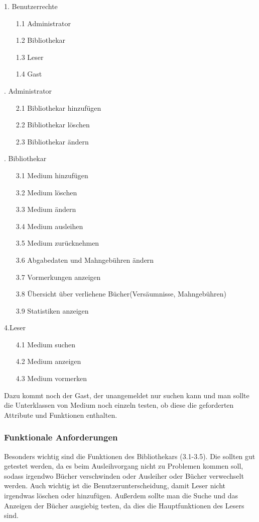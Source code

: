 \documentclass[fontsize=12pt,paper=a4,twoside]{scrartcl}
\begin{document}
1. Benutzerrechte\\
\begin{itemize}
\item[1.1]Administrator 
\item[1.2]Bibliothekar 
\item[1.3]Leser 
\item[1.4]Gast
\end{itemize}
. Administrator\\
\begin{itemize}
\item[2.1]Bibliothekar hinzufügen
\item[2.2]Bibliothekar löschen
\item[2.3]Bibliothekar ändern
\end{itemize}
. Bibliothekar\\
\begin{itemize}
\item[3.1]Medium hinzufügen
\item[3.2]Medium löschen
\item[3.3]Medium ändern
\item[3.4]Medium ausleihen
\item[3.5]Medium zurücknehmen
\item[3.6]Abgabedaten und Mahngebühren ändern
\item[3.7]Vormerkungen anzeigen
\item[3.8]Übersicht über verliehene Bücher(Versäumnisse, Mahngebühren)
\item[3.9]Statistiken anzeigen
\end{itemize}
\bigskip
4.Leser\\
\begin{itemize}
\item[4.1]Medium suchen
\item[4.2]Medium anzeigen
\item[4.3]Medium vormerken
\end{itemize}
\bigskip
Dazu kommt noch der Gast, der unangemeldet nur suchen kann und man sollte die Unterklassen von Medium noch einzeln testen, ob diese die geforderten Attribute und Funktionen enthalten.

\subsubsection{Funktionale Anforderungen} 

Besonders wichtig sind die Funktionen des Bibliothekars (3.1-3.5). Die sollten gut getestet werden, da es beim Ausleihvorgang nicht zu Problemen kommen soll, sodass irgendwo Bücher verschwinden oder Ausleiher oder Bücher verwechselt werden. Auch wichtig ist die Benutzerunterscheidung, damit Leser nicht irgendwas löschen oder hinzufügen. Außerdem sollte man die Suche und das Anzeigen der Bücher ausgiebig testen, da dies die Hauptfunktionen des Lesers sind.
\end{document}
